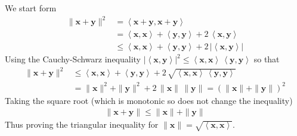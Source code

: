 \documentclass{sotonExamBoxes}    %
\newcommand{\len}[1]{\| #1 \|}
\newcommand{\inner}[2]{\left\langle #1, #2\right\rangle}
\begin{document}
\begin{question}{20}
\begin{qparts}
\begin{answer}
      We start form
      \begin{align*}
        \len{\bm{x}+\bm{y}}^2
        &=  \inner{\bm{x} + \bm{y}}{\bm{x} + \bm{y}}
        \\
        &=  \inner{\bm{x}}{\bm{x}} + \inner{\bm{y}}{\bm{y}}
          + 2 \, \inner{\bm{x}}{\bm{y}}
        \\
        &\leq \inner{\bm{x}}{\bm{x}} + \inner{\bm{y}}{\bm{y}}
          + 2 \, |\inner{\bm{x}}{\bm{y}}|
      \end{align*}
      Using the Cauchy-Schwarz inequality $|\inner{\bm{x}}{\bm{y}}|^2
      \leq \inner{\bm{x}}{\bm{x}}\, \inner{\bm{y}}{\bm{y}}$ so that
      \begin{align*}
         \len{\bm{x}+\bm{y}}^2
        &\leq  \inner{\bm{x}}{\bm{x}} + \inner{\bm{y}}{\bm{y}}
          + 2 \, \sqrt{\inner{\bm{x}}{\bm{x}}\, \inner{\bm{y}}{\bm{y}}}
        \\
        &= \len{\bm{x}}^2 + \len{\bm{y}}^2 + 2 \,
          \len{\bm{x}}\,\len{\bm{y}}
        = \left( \len{\bm{x}} + \len{\bm{y}}\right)^2
      \end{align*}
      Taking the square root (which is monotonic so does not change
      the inequality)
      \begin{align*}
         \len{\bm{x}+\bm{y}} \leq  \len{\bm{x}} + \len{\bm{y}}
      \end{align*}
      Thus proving the triangular inequality for
      $\len{\bm{x}} = \sqrt{\inner{\bm{x}}{\bm{x}}}$. 
    \end{answer}
  \end{qparts}
\end{question}
\freshpage

\end{document}
